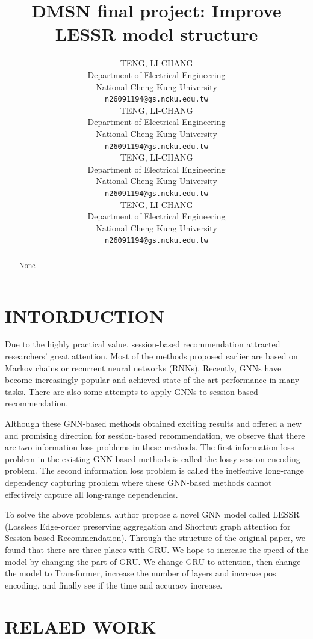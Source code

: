 \documentclass{article}
\title{DMSN final project: Improve LESSR model structure}
\author{%
  TENG, LI-CHANG\\
  Department of Electrical Engineering\\
  National Cheng Kung University\\
  \texttt{n26091194@gs.ncku.edu.tw} \\
  \And
  TENG, LI-CHANG\\
  Department of Electrical Engineering\\
  National Cheng Kung University\\
  \texttt{n26091194@gs.ncku.edu.tw} \\
  \AND
  TENG, LI-CHANG\\
  Department of Electrical Engineering\\
  National Cheng Kung University\\
  \texttt{n26091194@gs.ncku.edu.tw} \\
  \And
  TENG, LI-CHANG\\
  Department of Electrical Engineering\\
  National Cheng Kung University\\
  \texttt{n26091194@gs.ncku.edu.tw} \\
}
\begin{document}
\maketitle


\begin{abstract}
    None
    \vspace{2cm}
\end{abstract}


\section{INTORDUCTION}

Due to the highly practical value,
session-based recommendation attracted researchers’ great attention.
Most of the methods proposed earlier are based on Markov chains or
recurrent neural networks (RNNs). Recently, GNNs have become increasingly
popular and achieved state-of-the-art performance in many tasks.
There are also some attempts to apply GNNs to session-based recommendation.

Although these GNN-based methods obtained exciting results and
offered a new and promising direction for session-based recommendation,
we observe that there are two information loss problems in these methods.
The first information loss problem in the existing GNN-based methods
is called the lossy session encoding problem.
The second information loss problem is called the
ineffective long-range dependency capturing problem where
these GNN-based methods cannot effectively capture all long-range dependencies.

To solve the above problems, author propose a novel GNN model called
LESSR (Lossless Edge-order preserving aggregation
and Shortcut graph attention for Session-based Recommendation).
Through the structure of the original paper,
we found that there are three places with GRU.
We hope to increase the speed of the model by changing the part of GRU.
We change GRU to attention,
then change the model to Transformer,
increase the number of layers and increase pos encoding,
and finally see if the time and accuracy increase.



\section{RELAED WORK}
\end{document}
